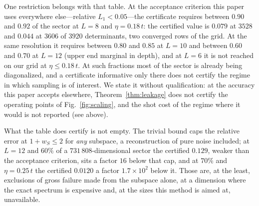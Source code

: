 One restriction belongs with that table. At the acceptance criterion this paper uses everywhere else---relative $L_1<0.05$---the
certificate requires between $0.90$ and $0.92$ of the sector at $L=8$ and $\eta=0.18\,t$: the certified
value is $0.079$ at $3528$ and $0.044$ at $3606$ of $3920$ determinants, two converged rows of the grid.
At the same resolution it requires between $0.80$ and $0.85$ at $L=10$ and between $0.60$ and $0.70$ at
$L=12$ (upper end marginal in depth), and at $L=6$ it is not reached on our grid at $\eta\le0.18\,t$.
At such fractions most of the sector is already being diagonalized, and a certificate informative
only there does not certify the regime in which sampling is of
interest. We state it without qualification: at the accuracy this paper accepts elsewhere,
Theorem~\ref{thm:leakage} does not certify the operating points of Fig.~\ref{fig:scaling}, and the shot
cost of the regime where it would is not reported (see above).

What the table does certify is not
empty. The trivial bound caps the relative error at $1+w_S\le2$ for \emph{any} subspace, a
reconstruction of pure noise included; at $L=12$ and $60\%$ of a $731\,808$-dimensional sector the
certified $0.129$, weaker than the acceptance criterion, sits a factor $16$ below that cap, and at $70\%$ and
$\eta=0.25\,t$ the certified $0.0120$ a factor $1.7\times10^{2}$
below it. Those are, at the least, exclusions of gross failure made from the subspace alone, at a dimension where the
exact spectrum is expensive and, at the sizes this method is aimed at, unavailable.

